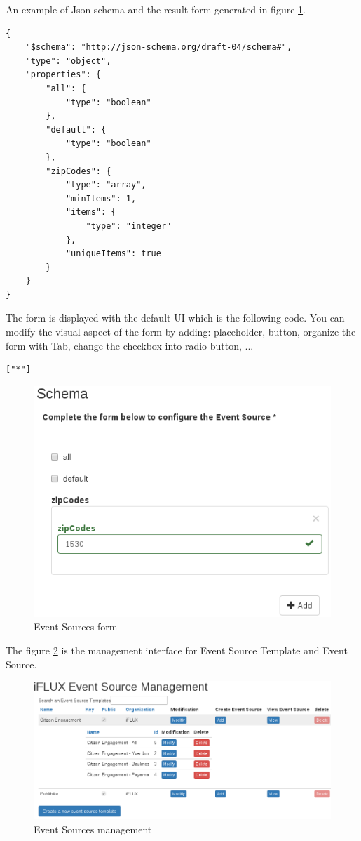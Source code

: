 An example of Json schema and the result form generated in figure \ref{fig:iflux-event-source-form}. 
\begin{lstlisting}
{
	"$schema": "http://json-schema.org/draft-04/schema#",
	"type": "object",
	"properties": {
		"all": {
			"type": "boolean"
		},
		"default": {
			"type": "boolean"
		},
		"zipCodes": {
			"type": "array",
			"minItems": 1,
			"items": {
				"type": "integer"
			},
			"uniqueItems": true
		}
	}
}
\end{lstlisting}

The form is displayed with the default UI which is the following code. You can modify the visual aspect of the form by adding: placeholder, button, organize the form with Tab, change the checkbox into radio button, ... 
\begin{lstlisting}
["*"]
\end{lstlisting}

\begin{figure}
\centering
\includegraphics[width=0.8\columnwidth]{figures/event-source-form.png}
\caption{Event Sources form}
\label{fig:iflux-event-source-form}
\end{figure}


The figure \ref{fig:iflux-event-source} is the management interface for Event Source Template and Event Source. 
\begin{figure}
\centering
\includegraphics[width=1\columnwidth]{figures/eventSource.png}
\caption{Event Sources management}
\label{fig:iflux-event-source}
\end{figure}

